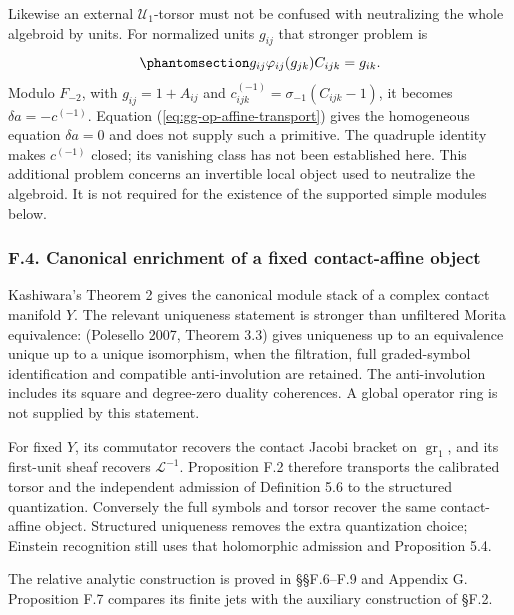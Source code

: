 \documentclass[
  english,
  11pt,
  reqno]{amsart}
\begin{document}
Likewise an external \(\mathscr U_1\)-torsor must not be confused with
neutralizing the whole algebroid by units. For normalized units
\(g_{ij}\) that stronger problem is
\begin{equation}\protect\phantomsection\label{eq:gg-op-neutralization}{
 g_{ij}\varphi_{ij}(g_{jk})C_{ijk}=g_{ik}.
}\end{equation} Modulo \(F_{-2}\), with \(g_{ij}=1+A_{ij}\) and
\(c^{(-1)}_{ijk}=\sigma_{-1}(C_{ijk}-1)\), it becomes
\(\delta a=-c^{(-1)}\). Equation (\ref{eq:gg-op-affine-transport}) gives
the homogeneous equation \(\delta a=0\) and does not supply such a
primitive. The quadruple identity makes \(c^{(-1)}\) closed; its
vanishing class has not been established here. This additional problem
concerns an invertible local object used to neutralize the algebroid. It
is not required for the existence of the supported simple modules below.

\protect{}\label{sec:gg-op-fixed-enrichment}

\subsubsection{F.4. Canonical enrichment of a fixed contact-affine
object}\label{f.4.-canonical-enrichment-of-a-fixed-contact-affine-object}

Kashiwara's Theorem 2 gives the canonical module stack of a complex
contact manifold \(Y\). The relevant uniqueness statement is stronger
than unfiltered Morita equivalence: (Polesello 2007, Theorem 3.3) gives
uniqueness up to an equivalence unique up to a unique isomorphism, when
the filtration, full graded-symbol identification and compatible
anti-involution are retained. The anti-involution includes its square
and degree-zero duality coherences. A global operator ring is not
supplied by this statement.

For fixed \(Y\), its commutator recovers the contact Jacobi bracket on
\(\operatorname{gr}_1\), and its first-unit sheaf recovers
\(\mathcal L^{-1}\). Proposition F.2 therefore transports the calibrated
torsor and the independent admission of Definition 5.6 to the structured
quantization. Conversely the full symbols and torsor recover the same
contact-affine object. Structured uniqueness removes the extra
quantization choice; Einstein recognition still uses that holomorphic
admission and Proposition 5.4.

The relative analytic construction is proved in §§F.6--F.9 and Appendix
G. Proposition F.7 compares its finite jets with the auxiliary
construction of §F.2.
\end{document}
